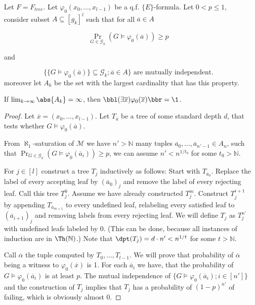 \begin{thrm}\label{mutindfind}
Let $F=F_{tree}$. Let $\varphi_0(x_0,\dots,x_{l-1})$ be a q.f. $\{E\}$-formula. Let $0<p\leq 1$, consider subset $A\subseteq[g_k]^l$ such that for all $\overline a \in A$ 

\[\Pr_{G\in\mathcal{G}_k}(G\models \varphi_0(\overline a))\geq p\]

and

\[\text{$\{\{G\models\varphi_0(\overline a)\}\subseteq \mathcal{G}_k;\overline a \in A\}$ are mutually independent.}\]
moreover let $A_k$ be the set with the largest cardinality that  has this property.

If $\lim_{k\to\infty} \abs{A_k}=\infty$, then $\bbl(\exists \overline x)\varphi_0(\overline x)\bbr=\1$.
\end{thrm}

\begin{proof}
Let $\overline x = (x_0,\dots,x_{l-1})$. Let $T_{\overline a}$ be a tree of some standard depth $d$, that tests whether $G\models\varphi_0(\overline a)$.

From $\aleph_1$-saturation of $\mathcal{M}$ we have $n'>\mathbb{N}$ many tuples \(\overline a_0,\dots,\overline a_{n'-1}\in A_n\), such that \(\Pr_{G\in\mathcal{G}_k}(G\models\varphi_0(\overline a_i))\geq p\), we can assume $n'<n^{1/t_0}$ for some $t_0>\mathbb{N}$.


For $j\in[l]$ construct a tree $T_j$ inductively as follows: Start with $T_{\overline a_0}$. Replace the label of every accepting leaf by $(\overline a_0)_j$ and remove the label of every rejecting leaf. Call this tree $T_j^0$. Assume we have already constructed $T_j^{m}$. Construct $T_j^{i+1}$ by appending $T_{\overline a_{m+1}}$ to every undefined leaf, relabeling every satisfied leaf to $(\overline a_{i+1})_j$ and removing labels from every rejecting leaf. We will define $T_j$ as $T_j^{n'}$ with undefined leafs labeled by $0$. (This can be done, because all instances of induction are in $\Th(\mathbb{N})$.) Note that $\dpt(T_j)=d\cdot n' < n^{1/t}$ for some $t>\mathbb{N}$. 

Call $\overline \alpha$ the tuple computed by $T_0,\dots,T_{l-1}$. We will prove that probability of $\overline \alpha$ being a witness to $\varphi_0(\overline x)$ is 1. For each $\overline a_i$ we have, that the probability of $G\models\varphi_0(\overline a_i)$ is at least $p$. The mutual independence of ${\{G\models\varphi_0(\overline a_i);i\in[n']\}}$ and the construction of $T_j$ implies that $T_j$ has a probability of $(1-p)^{n'}$ of failing, which is obviously almost $0$.
\end{proof}

